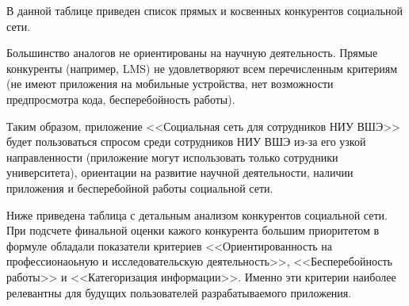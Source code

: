 % 

В данной таблице приведен список прямых и косвенных конкурентов социальной сети.


Большинство аналогов не ориентированы на научную деятельность. 
Прямые конкуренты (например, LMS) не удовлетворяют всем перечисленным критериям (не имеют приложения на мобильные устройства, нет возможности предпросмотра кода, бесперебойность работы). 


Таким образом, приложение <<Социальная сеть для сотрудников НИУ ВШЭ>> будет пользоваться спросом среди сотрудников НИУ ВШЭ из-за его узкой направленности (приложение могут использовать только сотрудники университета), ориентации на развитие научной деятельности, наличии приложения и бесперебойной работы социальной сети.


Ниже приведена таблица с детальным анализом конкурентов социальной сети. При подсчете финальной оценки кажого конкурента большим приоритетом в формуле обладали показатели критериев <<Ориентированность на профессионаоьную и исследовательскую деятельность>>, <<Бесперебойность работы>> и <<Категоризация информации>>. Именно эти критерии наиболее релевантны для будущих пользователей разрабатываемого приложения.

\renewcommand{\labelenumi}{\textbf{\Alph{enumi}}.}

\renewcommand{\labelenumii}{\textbf{\alph{enumi}\arabic{enumii}}}

